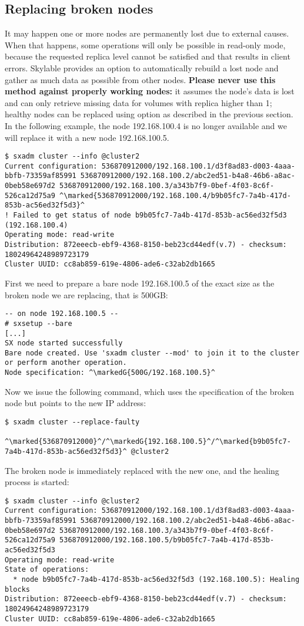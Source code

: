 \subsection{Replacing broken nodes}
It may happen one or more nodes are permanently lost due to external causes.
When that happens, some operations will only be possible in read-only mode,
because the requested replica level cannot be satisfied and that results in
client errors. Skylable \SX provides an option to automatically rebuild
a lost node and gather as much data as possible from other nodes.
\textbf{Please never use this method against properly working nodes:} it
assumes the node's data is lost and can only retrieve missing data for volumes
with replica higher than 1; healthy nodes can be replaced using 
option as described in the previous section. In the following example, the node
192.168.100.4 is no longer available and we will replace it with a new node
192.168.100.5.
\begin{lstlisting}
$ sxadm cluster --info @cluster2
Current configuration: 536870912000/192.168.100.1/d3f8ad83-d003-4aaa-bbfb-73359af85991 536870912000/192.168.100.2/abc2ed51-b4a8-46b6-a8ac-0beb58e697d2 536870912000/192.168.100.3/a343b7f9-0bef-4f03-8c6f-526ca12d75a9 ^\marked{536870912000/192.168.100.4/b9b05fc7-7a4b-417d-853b-ac56ed32f5d3}^
! Failed to get status of node b9b05fc7-7a4b-417d-853b-ac56ed32f5d3 (192.168.100.4)
Operating mode: read-write
Distribution: 872eeecb-ebf9-4368-8150-beb23cd44edf(v.7) - checksum: 18024964248989723179
Cluster UUID: cc8ab859-619e-4806-ade6-c32ab2db1665
\end{lstlisting}
First we need to prepare a bare node 192.168.100.5 of the exact size as the broken
node we are replacing, that is 500GB:
\begin{lstlisting}
-- on node 192.168.100.5 --
# sxsetup --bare
[...]
SX node started successfully
Bare node created. Use 'sxadm cluster --mod' to join it to the cluster
or perform another operation.
Node specification: ^\markedG{500G/192.168.100.5}^
\end{lstlisting}
Now we issue the following command, which uses the specification of the broken
node but points to the new IP address:
\begin{lstlisting}
$ sxadm cluster --replace-faulty
    ^\marked{536870912000}^/^\markedG{192.168.100.5}^/^\marked{b9b05fc7-7a4b-417d-853b-ac56ed32f5d3}^ @cluster2
\end{lstlisting}
The broken node is immediately replaced with the new one, and the healing process
is started:
\begin{lstlisting}
$ sxadm cluster --info @cluster2
Current configuration: 536870912000/192.168.100.1/d3f8ad83-d003-4aaa-bbfb-73359af85991 536870912000/192.168.100.2/abc2ed51-b4a8-46b6-a8ac-0beb58e697d2 536870912000/192.168.100.3/a343b7f9-0bef-4f03-8c6f-526ca12d75a9 536870912000/192.168.100.5/b9b05fc7-7a4b-417d-853b-ac56ed32f5d3
Operating mode: read-write
State of operations:
  * node b9b05fc7-7a4b-417d-853b-ac56ed32f5d3 (192.168.100.5): Healing blocks
Distribution: 872eeecb-ebf9-4368-8150-beb23cd44edf(v.7) - checksum: 18024964248989723179
Cluster UUID: cc8ab859-619e-4806-ade6-c32ab2db1665
\end{lstlisting}
